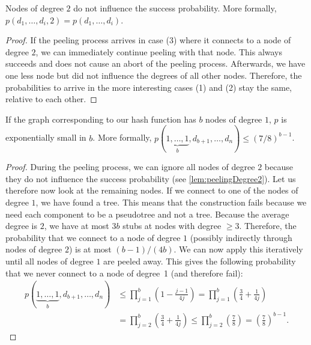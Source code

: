 \documentclass[a4paper,USenglish,cleveref]{lipics-v2021}
\begin{document}
\begin{lemma}
  Nodes of degree $2$ do not influence the success probability.
  More formally, $p(d_1, \ldots, d_{i},2) = p(d_1,\ldots,d_{i})$.
  \label{lem:peelingDegree2}
\end{lemma}
\begin{proof}
  If the peeling process arrives in case (3) where it connects to a node of degree $2$, we can immediately continue peeling with that node.
  This always succeeds and does not cause an abort of the peeling process.
  Afterwards, we have one less node but did not influence the degrees of all other nodes.
  Therefore, the probabilities to arrive in the more interesting cases (1) and (2) stay the same, relative to each other.
\end{proof}

\begin{lemma}
  If the graph corresponding to our hash function has $b$ nodes of degree $1$, $p$ is exponentially small in $b$.
  More formally, $p(\underbrace{1, \ldots, 1}_b, d_{b+1}, \ldots, d_{n}) \leq (7/8)^{b-1}$.
  \label{lem:peelingDegree1}
\end{lemma}
\begin{proof}
  During the peeling process, we can ignore all nodes of degree $2$ because they do not influence the success probability (see \cref{lem:peelingDegree2}).
  Let us therefore now look at the remaining nodes.
  If we connect to one of the nodes of degree $1$, we have found a tree.
  This means that the construction fails because we need each component to be a pseudotree and not a tree.
  Because the average degree is $2$, we have at most $3b$ stubs at nodes with degree $\geq 3$.
  Therefore, the probability that we connect to a node of degree $1$ (possibly indirectly through nodes of degree $2$) is at most $(b-1)/(4b)$.
  We can now apply this iteratively until all nodes of degree $1$ are peeled away.
  This gives the following probability that we never connect to a node of degree~1 (and therefore fail):
  \begin{align*}
    p(\underbrace{1, \ldots, 1}_b, d_{b+1}, \ldots, d_{n})
      &\leq \prod_{j=1}^b\left(1 - \frac{j-1}{4j}\right)
      = \prod_{j=1}^b\left(\frac{3}{4} + \frac{1}{4j}\right) \\
      &= \prod_{j=2}^b\left(\frac{3}{4} + \frac{1}{4j}\right)
      \leq \prod_{j=2}^b\left(\frac{7}{8}\right)
      = \left(\frac{7}{8}\right)^{b-1}.
    \tag*{\qedhere}
  \end{align*}
\end{proof}
\end{document}
